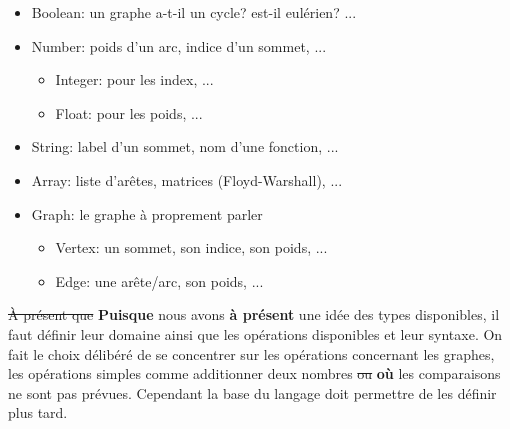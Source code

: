 \documentclass[french]{article}
\begin{document}
	\begin{itemize}
		\item Boolean: un graphe a-t-il un cycle? est-il eulérien? ...
		\item Number: poids d'un arc, indice d'un sommet, ...
		\begin{itemize}
			\item Integer: pour les index, ...
			\item Float: pour les poids, ...
		\end{itemize}
		\item String: label d'un sommet, nom d'une fonction, ...
		\item Array: liste d'arêtes, matrices (Floyd-Warshall), ...
		\item Graph: le graphe à proprement parler
		\begin{itemize}
			\item Vertex: un sommet, son indice, son poids, ...
			\item Edge: une arête/arc, son poids, ...
		\end{itemize}
	\end{itemize} 
	
	\sout{À présent que} \textbf{Puisque} nous avons \textbf{à présent} une idée des types disponibles, il faut définir leur domaine ainsi que les opérations disponibles et leur syntaxe. On fait le choix délibéré de se concentrer sur les opérations concernant les graphes, les opérations simples comme additionner deux nombres \sout{ou} \textbf{où} les comparaisons ne sont pas prévues. Cependant la base du langage doit permettre de les définir plus tard. 
	
\end{document}
